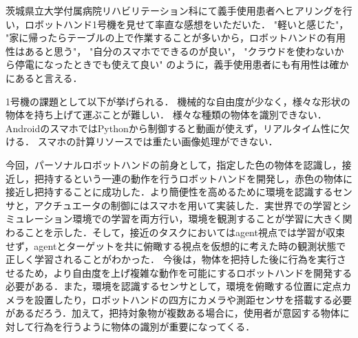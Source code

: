 茨城県立大学付属病院リハビリテーション科にて義手使用患者へヒアリングを行い，ロボットハンド1号機を見せて率直な感想をいただいた．
"軽いと感じた"，
"家に帰ったらテーブルの上で作業することが多いから，ロボットハンドの有用性はあると思う"，
"自分のスマホでできるのが良い"，
"クラウドを使わないから停電になったときでも使えて良い"
のように，義手使用患者にも有用性は確かにあると言える．

1号機の課題として以下が挙げられる．
機械的な自由度が少なく，様々な形状の物体を持ち上げて運ぶことが難しい．
様々な種類の物体を識別できない．
AndroidのスマホではPythonから制御すると動画が使えず，リアルタイム性に欠ける．
スマホの計算リソースでは重たい画像処理ができない．



今回，パーソナルロボットハンドの前身として，指定した色の物体を認識し，接近し，把持するという一連の動作を行うロボットハンドを開発し，赤色の物体に接近し把持することに成功した．より簡便性を高めるために環境を認識するセンサと，アクチュエータの制御にはスマホを用いて実装した．実世界での学習とシミュレーション環境での学習を両方行い，環境を観測することが学習に大きく関わることを示した．そして，接近のタスクにおいてはagent視点では学習が収束せず，agentとターゲットを共に俯瞰する視点を仮想的に考えた時の観測状態で正しく学習されることがわかった．
今後は，物体を把持した後に行為を実行させるため，より自由度を上げ複雑な動作を可能にするロボットハンドを開発する必要がある．また，環境を認識するセンサとして，環境を俯瞰する位置に定点カメラを設置したり，ロボットハンドの四方にカメラや測距センサを搭載する必要があるだろう．加えて，把持対象物が複数ある場合に，使用者が意図する物体に対して行為を行うように物体の識別が重要になってくる．



